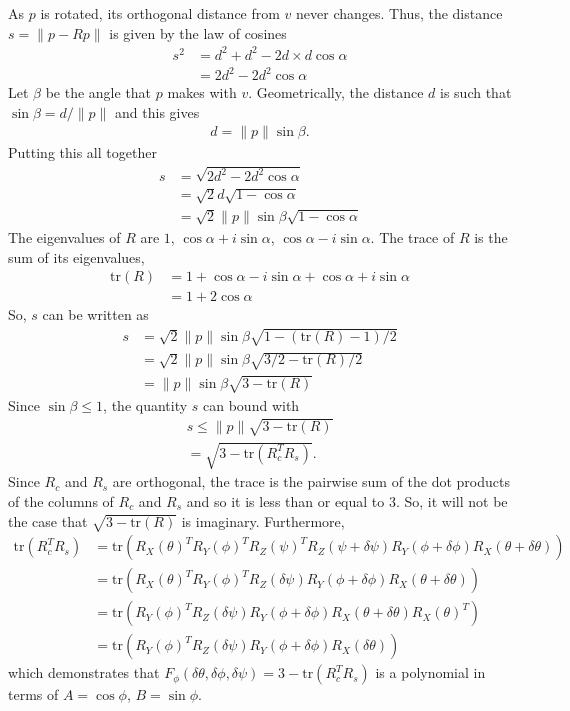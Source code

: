 \documentclass[12pt]{article}
\begin{document}
As $p$ is rotated, its orthogonal distance from $v$ never changes.  Thus, the distance $s = \|p - R p\|$ is given by the law of cosines
\begin{align}
s^2 &= d^2 + d^2 - 2d \times d \cos \alpha\\
       &= 2 d^2 - 2d^2 \cos \alpha
\end{align}
Let $\beta$ be the angle that $p$ makes with $v$.  Geometrically, the distance $d$ is such that $\sin \beta = d / \|p\|$ and this gives 
\begin{align}
d = \|p\| \sin \beta.
\end{align}
Putting this all together
\begin{align}
s &= \sqrt{2 d^2 - 2d^2 \cos \alpha}\\
   &= \sqrt{2}d \sqrt{1   - \cos \alpha}\\
   &= \sqrt{2}\|p\| \sin \beta \sqrt{1   - \cos \alpha}
\end{align} 
The eigenvalues of $R$ are $1$, $\cos \alpha + i \sin \alpha$, $\cos \alpha - i \sin \alpha$.  The trace of $R$ is
the sum of its eigenvalues, 
\begin{align}
\text{tr}(R) &= 1 + \cos \alpha - i \sin \alpha + \cos \alpha + i \sin \alpha\\
                   &= 1 + 2 \cos \alpha
\end{align}  
So, $s$ can be written as
\begin{align}
s &=   \sqrt{2}\|p\| \sin \beta \sqrt{1   -  (\text{tr}(R) - 1) / 2}\\
   &=   \sqrt{2}\|p\| \sin \beta \sqrt{3/2   -  \text{tr}(R)/2}\\
   &=   \|p\| \sin \beta \sqrt{3   -  \text{tr}(R)}
\end{align} 
Since $\sin \beta \leq 1$, the quantity $s$ can bound with
\begin{align}
s \leq \|p\|  \sqrt{3   -  \text{tr}(R)}\\
    =  \sqrt{3   -  \text{tr}(R_c^TR_s)}.
\end{align}
Since $R_c$ and $R_s$ are orthogonal, the trace is the pairwise sum of the dot products of the columns of $R_c$ and $R_s$ and so it is less than or equal to 3.  So,
it will not be the case that $ \sqrt{3   -  \text{tr}(R)}$ is imaginary.  Furthermore,
\begin{align}
 \text{tr}(R_c^TR_s) &= \text{tr}(R_X(\theta)^T R_Y(\phi)^T R_Z(\psi)^TR_Z(\psi + \delta \psi) R_Y(\phi + \delta \phi)R_X(\theta + \delta \theta))\\
 &=  \text{tr}(R_X(\theta)^T R_Y(\phi)^T R_Z(\delta \psi) R_Y(\phi + \delta \phi)R_X(\theta + \delta \theta))\\
&=  \text{tr}( R_Y(\phi)^T R_Z(\delta \psi) R_Y(\phi + \delta \phi)R_X(\theta + \delta \theta)R_X(\theta)^T)\\
&= \text{tr}( R_Y(\phi)^T R_Z(\delta \psi) R_Y(\phi + \delta \phi)R_X( \delta \theta))
\end{align}
which demonstrates that $F_\phi(\delta \theta, \delta \phi, \delta \psi)  = 3   -  \text{tr}(R_c^TR_s)$ is a polynomial in terms of $A = \cos \phi$, $B = \sin \phi$.\\
\end{document}

